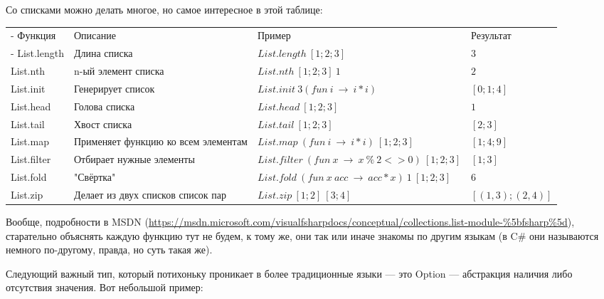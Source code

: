 \documentclass[a5paper]{article}
\begin{document}
Со списками можно делать многое, но самое интересное в этой таблице: 
\begin{tabu} {| X[0.5 l p] | X[1 l p] | X[1 l p] | X[0.5 l p] |}
	\tabucline-
	Функция                & Описание                            & Пример                                              & Результат            \\
	\tabucline-
	\everyrow{\tabucline-}
	List.length            & Длина списка                        & $List.length\ [1;2;3]$                              & $3$                  \\
	List.nth               & n-ый элемент списка                 & $List.nth\ [1; 2; 3]\ 1$                            & $2$                  \\
	List.init              & Генерирует список                   & $List.init\ 3 (fun\ i\ \rightarrow\ i * i)$         & $[0; 1; 4]$          \\
	List.head              & Голова списка                       & $List.head\ [1; 2; 3]$                              & $1$                  \\
	List.tail              & Хвост списка                        & $List.tail\ [1; 2; 3]$                              & $[2; 3]$             \\
	List.map               & Применяет функцию ко всем элементам & $List.map\ (fun\ i\ \rightarrow\ i * i)\ [1; 2; 3]$ & $[1; 4; 9]$          \\
	List.filter            & Отбирает нужные элементы            & $List.filter\ (fun\ x\ \rightarrow\ x\ \%\ 2 <> 0)\ [1; 2; 3]$ & $[1; 3]$  \\
	List.fold              & "Свёртка"  & $List.fold\ (fun\ x\ acc\ \rightarrow\ acc * x)\ 1\ [1; 2; 3]$               & $6$                  \\
	List.zip               & Делает из двух списков список пар   & $List.zip\ [1; 2]\ [3; 4]$                          & $[(1, 3); (2, 4)]$   \\
\end{tabu}

Вообще, подробности в MSDN (\url{https://msdn.microsoft.com/visualfsharpdocs/conceptual/collections.list-module-\%5bfsharp\%5d}), старательно объяснять каждую функцию тут не будем, к тому же, они так или иначе знакомы по другим языкам (в C\# они называются немного по-другому, правда, но суть такая же).

Следующий важный тип, который потихоньку проникает в более традиционные языки --- это Option --- абстракция наличия либо отсутствия значения. Вот небольшой пример:
\end{document}
